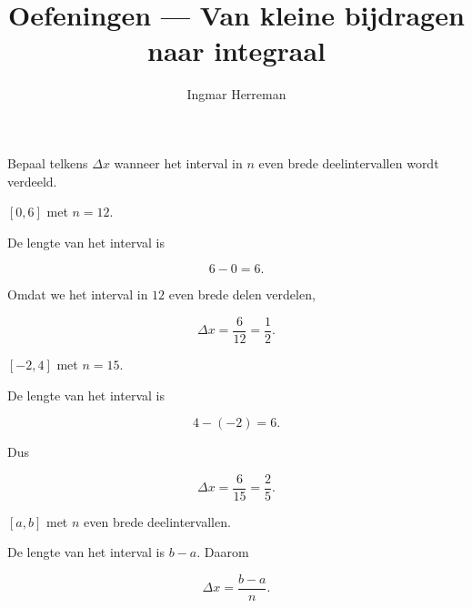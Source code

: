 \documentclass{ximera}
\title{Oefeningen --- Van kleine bijdragen naar integraal}
\author{Ingmar Herreman}
\begin{document}











\maketitle

\FVDbeginExercises





\begin{oefening}{\oefB\ESS}

Bepaal telkens \(\Delta x\) wanneer het interval in \(n\) even brede
deelintervallen wordt verdeeld.

\begin{question}
\([0,6]\) met \(n=12\).

\begin{oplossing}
De lengte van het interval is

\[
6-0=6.
\]

Omdat we het interval in \(12\) even brede delen verdelen,

\[
\Delta x=\frac{6}{12}=\boxed{\frac12}.
\]
\end{oplossing}
\end{question}

\begin{question}
\([-2,4]\) met \(n=15\).

\begin{oplossing}
De lengte van het interval is

\[
4-(-2)=6.
\]

Dus

\[
\Delta x=\frac{6}{15}=\boxed{\frac25}.
\]
\end{oplossing}
\end{question}

\begin{question}
\([a,b]\) met \(n\) even brede deelintervallen.

\begin{oplossing}
De lengte van het interval is \(b-a\). Daarom

\[
\boxed{\Delta x=\frac{b-a}{n}}.
\]
\end{oplossing}
\end{question}

\end{oefening}
\end{document}

